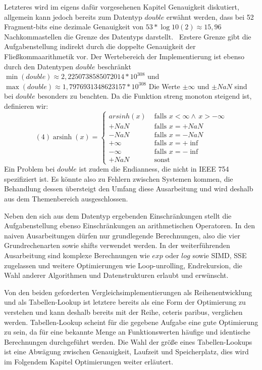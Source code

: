 \documentclass[course=erap] {aspdoc}
\begin{document}
     Letzteres wird im eigens dafür vorgesehenen Kapitel Genauigkeit diskutiert, allgemein kann jedoch bereits zum Datentyp $double$ erwähnt werden, dass bei 52 Fragment-bits eine dezimale Genauigkeit von $53*\log10(2) \approx 15,96$ Nachkommastellen die Grenze des Datentyps darstellt.~\cite{StandardforBinaryFloating}
     Erstere Grenze gibt die Aufgabenstellung indirekt durch die doppelte Genauigkeit der Fließkommaarithmetik vor.
     Der Wertebereich der Implementierung ist ebenso durch den Datentypen $double$ beschränkt $\min(double) \approx 2,2250738585072014* 10^{308}$ und $\max(double) \approx 1,7976931348623157 * 10^{308}$
     Die Werte $\pm \infty$ und $\pm NaN$ sind bei $double$ besonders zu beachten.
     Da die Funktion streng monoton steigend ist, definieren wir:
     \[(4) \operatorname{arsinh}(x) =
     \begin{cases}
         arsinh(x)     & \text{ falls } x < \infty \wedge \, x > -\infty \\
         +NaN  & \text{ falls } x = +NaN \\
         -NaN  & \text{ falls } x = -NaN \\
         +\infty     & \text{ falls } x = +\inf \\
         -\infty     & \text{ falls } x = -\inf \\
         +NaN     & \text{ sonst }
 
     \end{cases}\]
     Ein Problem bei $double$ ist zudem die Endianness, die nicht in IEEE 754~\cite{StandardforBinaryFloating-PointArithmetic} spezifiziert ist.
     Es könnte also zu Fehlern zwischen Systemen kommen, die Behandlung dessen übersteigt den Umfang diese Ausarbeitung und wird deshalb aus dem Themenbereich ausgeschlossen.
 
     Neben den sich aus dem Datentyp ergebenden Einschränkungen stellt die Aufgabenstellung ebenso Einschränkungen an arithmetischen Operatoren.
     In den naiven Ausarbeitungen dürfen nur grundlegende Berechnungen, also die vier Grundrechenarten sowie shifts verwendet werden.
     In der weiterführenden Ausarbeitung sind komplexe Berechnungen wie $exp$ oder $log$ sowie SIMD, SSE zugelassen und weitere Optimierungen wie Loop-unrolling, Endrekursion, die Wahl anderer Algorithmen und Datenstrukturen erlaubt und erwünscht.
 
 
     Von den beiden geforderten Vergleichsimplementierungen als Reihenentwicklung und als Tabellen-Lookup ist letztere bereits als eine Form der Optimierung zu verstehen und kann deshalb bereits mit der Reihe, ceteris paribus, verglichen werden.
     Tabellen-Lookup scheint für die gegebene Aufgabe eine gute Optimierung zu sein, da für eine bekannte Menge an Funktionswerten häufige und identische Berechnungen durchgeführt werden.
     Die Wahl der größe eines Tabellen-Lookups ist eine Abwägung zwischen Genauigkeit, Laufzeit und Speicherplatz, dies wird im Folgendem Kapitel Optimierungen weiter erläutert.
 
\end{document}
